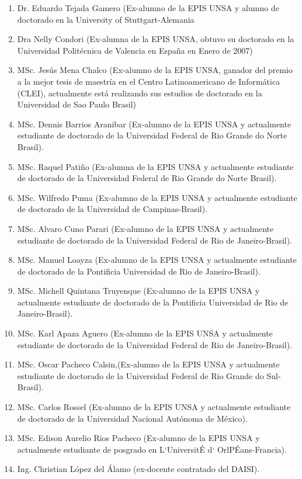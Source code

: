 \begin{enumerate}
\item Dr. Eduardo Tejada Gamero (Ex-alumno de la EPIS UNSA y alumno de doctorado en la University of Stuttgart-Alemania
\item Dra Nelly Condori (Ex-alumna de la EPIS UNSA, obtuvo su doctorado en la Universidad Politécnica de Valencia en España en Enero de 2007)
\item MSc. Jesús Mena Chalco (Ex-alumno de la EPIS UNSA, ganador del premio a la mejor tesis de maestría en el Centro Latinoamericano de Informática (CLEI), actualmente está realizando sus estudios de doctorado en la Universidad de Sao Paulo Brasil)
\item MSc. Dennis Barrios Aranibar (Ex-alumno de la EPIS UNSA y actualmente estudiante de doctorado de la Universidad Federal de Rio Grande do Norte Brasil).
\item MSc. Raquel Patiño (Ex-alumna de la EPIS UNSA y actualmente estudiante de doctorado de la Universidad Federal de Rio Grande do Norte Brasil).
\item MSc. Wilfredo Puma (Ex-alumno de la EPIS UNSA y actualmente estudiante de doctorado de la Universidad de Campinas-Brasil).
\item MSc. Alvaro Cuno Parari (Ex-alumno de la EPIS UNSA y actualmente estudiante de doctorado de la Universidad Federal de Rio de Janeiro-Brasil).
\item MSc. Manuel Loayza (Ex-alumno de la EPIS UNSA y actualmente estudiante de doctorado de la Pontificia Universidad de Rio de Janeiro-Brasil).
\item MSc. Michell Quintana Truyenque (Ex-alumno de la EPIS UNSA y actualmente estudiante de doctorado de la Pontificia Universidad de Rio de Janeiro-Brasil).
\item MSc. Karl Apaza Aguero (Ex-alumno de la EPIS UNSA y actualmente estudiante de doctorado de la Universidad Federal de Rio de Janeiro-Brasil).
\item MSc. Oscar Pacheco Calsin,(Ex-alumno de la EPIS UNSA y actualmente estudiante de doctorado de la Universidad Federal de Rio Grande do Sul-Brasil).
\item MSc. Carlos Rossel (Ex-alumno de la EPIS UNSA y actualmente estudiante de doctorado de la Universidad Nacional Autónoma de México).
\item MSc. Edison Aurelio Rios Pacheco (Ex-alumno de la EPIS UNSA y actualmente estudiante de posgrado en L`UniversitÉ d` OrlPÉans-Francia).
\item Ing. Christian López del Álamo (ex-docente contratado del DAISI).
\end{enumerate}
